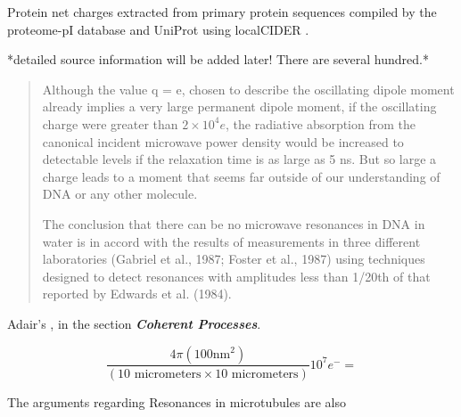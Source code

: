 \documentclass[paper.tex]{subfiles}
\begin{document}
Protein net charges extracted from primary protein sequences compiled by the proteome-pI database \cite{ProteomepI2017} and UniProt using localCIDER \cite{CIDER2017} . 

*detailed source information will be added later! There are several hundred.*

\cite{Vibrational2002}
\begin{quote}
Although the value q = e, chosen to describe the oscillating dipole moment already implies a very large permanent dipole moment, if the oscillating charge were greater
than $2\times 10^4 e$, the radiative absorption from the canonical
incident microwave power density would be increased to
detectable levels if the relaxation time is as large as 5 ns.
But so large a charge leads to a moment that seems far
outside of our understanding of DNA or any other molecule.


The conclusion that there can be no microwave resonances in DNA in water is in accord with the results of
measurements in three different laboratories (Gabriel et al.,
1987; Foster et al., 1987) using techniques designed to
detect resonances with amplitudes less than 1/20th of that
reported by Edwards et al. (1984).
\end{quote}

Adair's \cite{Vibrational2002}, in the section {\it \bf Coherent Processes}. 

$$\frac{4 \pi (100 \text{nm}^2)}{(10 \text{ micrometers} \times 10 \text{ micrometers})} 10^7 e^- = $$

The arguments regarding Resonances in microtubules are also 
\end{document}
